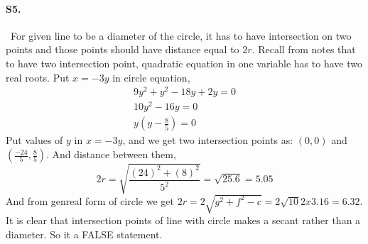 \documentclass{article}
\begin{document}
\paragraph{S5.}\
For given line to be a diameter of the circle, it has to have intersection on two points and those points should have distance equal to $2r$. Recall from notes that to have two intersection point, quadratic equation in one variable has to have two real roots. Put $x=-3y$ in circle equation,
\begin{align*}
    9y^2+y^2-18y+2y=0\\
    10y^2-16y=0\\
    y(y-\frac{8}{5})=0
\end{align*}
Put values of $y$ in $x=-3y$, and we get two intersection points as: $(0,0)$ and $(\frac{-24}{5},\frac{8}{5})$. And distance between them,
\begin{equation*}
    2r=\sqrt{\frac{(24)^2+(8)^2}{5^2}}=\sqrt{25.6}=5.05
\end{equation*}
And from genreal form of circle we get $2r=2\sqrt{g^2+f^2-c}=2\sqrt{10}2x3.16=6.32$. It is clear that intersection points of line with circle makes a secant rather than a diameter. So it a FALSE statement.
\end{document}
